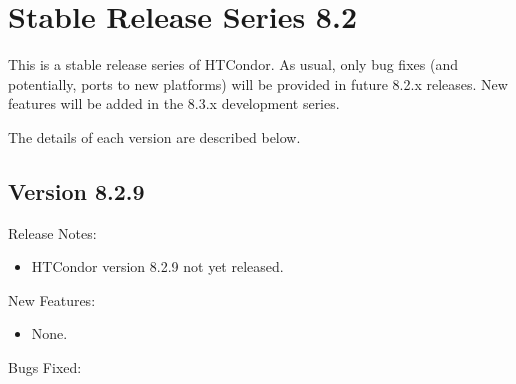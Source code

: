 
\section{\label{sec:History-8-2}Stable Release Series 8.2}

This is a stable release series of HTCondor.
As usual, only bug fixes (and potentially, ports to new platforms)
will be provided in future 8.2.x releases.
New features will be added in the 8.3.x development series.

The details of each version are described below.


\subsection*{\label{sec:New-8-2-9}Version 8.2.9}

\noindent Release Notes:

\begin{itemize}

\item HTCondor version 8.2.9 not yet released.

\end{itemize}


\noindent New Features:

\begin{itemize}

\item None.

\end{itemize}

\noindent Bugs Fixed:

